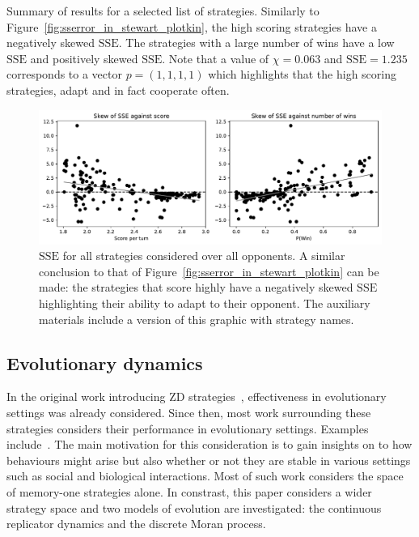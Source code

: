 \documentclass[a4paper]{article}
\newcommand{\SSe}{\text{SSE}}
\begin{document}
\begin{table}[!hbtp]
    \begin{center}
    \small
    
    \end{center}
    \caption{Summary of results for a selected list of strategies. Similarly to
        Figure~\ref{fig:sserror_in_stewart_plotkin}, the high scoring strategies
        have a negatively skewed \(\SSe\). The strategies with a
        large number of wins have a low \(\SSe\) and positively skewed
        \(\SSe\). Note that a value of \(\chi=0.063\) and \(\SSe=1.235\)
        corresponds to a vector \(p=(1,1,1,1)\) which highlights that the high
        scoring strategies, adapt and in fact cooperate often.}
    \label{tbl:overall_summary_results}
\end{table}

\begin{figure}[!htbp]
    \centering
    \includegraphics[width=\textwidth]{./assets/img/sserror_in_std/main.pdf}
    \caption{\(\SSe\) for all strategies considered over all opponents.
        A similar conclusion to that of
        Figure~\ref{fig:sserror_in_stewart_plotkin} can be made: the strategies
        that score highly have a negatively skewed \(\SSe\) highlighting their
        ability to adapt to their opponent. The auxiliary materials include a
        version of this graphic with strategy names.}
        \label{fig:sserror_in_std}
\end{figure}

\subsection{Evolutionary dynamics}\label{sec:evolutionary-dynamics}

In the original work introducing ZD strategies~\cite{Press2012}, effectiveness
in evolutionary settings was already considered. Since then, most work
surrounding these strategies considers their performance in evolutionary
settings. Examples include~\cite{adami2013evolutionary, hilbe2018partners,
Hilbe2013, hilbe2013adaptive, hilbe2015partners, ichinose2018zero, Moran1707}.
The main motivation for this consideration is to gain insights on to how
behaviours might arise but also whether or not they are stable in various
settings such as social and biological interactions. Most of such work
considers the space of memory-one strategies alone. In constrast, this paper considers a wider
strategy space and two models of evolution are investigated: the
continuous replicator dynamics and the discrete Moran process.
\end{document}
